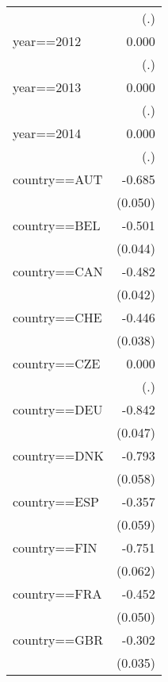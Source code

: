 \begin{table}[htbp]
\begin{tabular}{l*{1}{D{.}{.}{-1}}}
                    &         (.)         \\
\addlinespace
year==2012          &       0.000         \\
                    &         (.)         \\
\addlinespace
year==2013          &       0.000         \\
                    &         (.)         \\
\addlinespace
year==2014          &       0.000         \\
                    &         (.)         \\
\addlinespace
country==AUT        &      -0.685\sym{***}\\
                    &     (0.050)         \\
\addlinespace
country==BEL        &      -0.501\sym{***}\\
                    &     (0.044)         \\
\addlinespace
country==CAN        &      -0.482\sym{***}\\
                    &     (0.042)         \\
\addlinespace
country==CHE        &      -0.446\sym{***}\\
                    &     (0.038)         \\
\addlinespace
country==CZE        &       0.000         \\
                    &         (.)         \\
\addlinespace
country==DEU        &      -0.842\sym{***}\\
                    &     (0.047)         \\
\addlinespace
country==DNK        &      -0.793\sym{***}\\
                    &     (0.058)         \\
\addlinespace
country==ESP        &      -0.357\sym{***}\\
                    &     (0.059)         \\
\addlinespace
country==FIN        &      -0.751\sym{***}\\
                    &     (0.062)         \\
\addlinespace
country==FRA        &      -0.452\sym{***}\\
                    &     (0.050)         \\
\addlinespace
country==GBR        &      -0.302\sym{***}\\
                    &     (0.035)         \\

\end{tabular}
\end{table}
